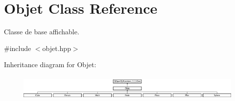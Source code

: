 \hypertarget{class_objet}{\section{Objet Class Reference}
\label{class_objet}
}


Classe de base affichable.  




{\ttfamily \#include $<$objet.\+hpp$>$}

Inheritance diagram for Objet\+:\begin{figure}[H]
\begin{center}
\leavevmode
\includegraphics[height=1.230769cm]{class_objet}
\end{center}
\end{figure}
